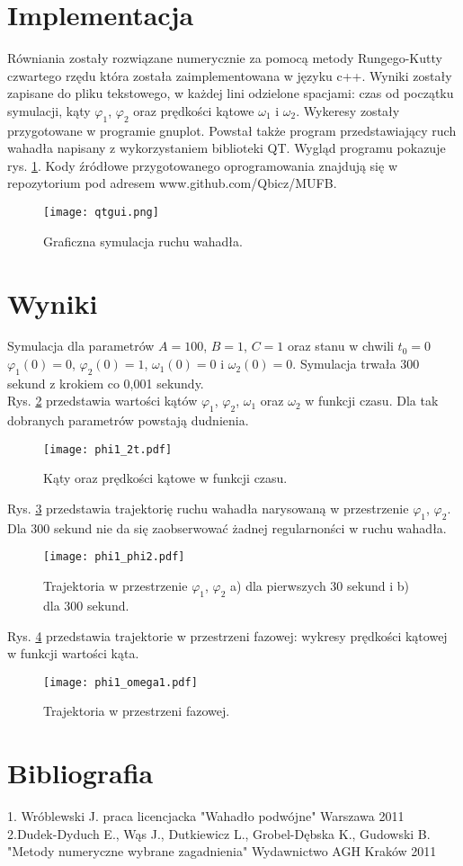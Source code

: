 \documentclass[11pt]{aghdpl}
\begin{document}
\section{Implementacja}
Równiania zostały rozwiązane numerycznie za pomocą metody Rungego-Kutty czwartego rzędu która została zaimplementowana w języku c++. Wyniki zostały zapisane do pliku tekstowego, w każdej lini odzielone spacjami: czas od początku symulacji, kąty $\varphi_1$, $\varphi_2$ oraz prędkości kątowe $\omega_1$ i $\omega_2$. Wykeresy zostały przygotowane w programie gnuplot. Powstał także program przedstawiający ruch wahadła napisany z wykorzystaniem biblioteki QT. Wygląd programu pokazuje rys. \ref{QTgui}. Kody źródłowe przygotowanego oprogramowania znajdują się w repozytorium pod adresem www.github.com/Qbicz/MUFB. 

\begin{figure}[h!]
	\centering
	\label{QTgui}
	\texttt{[image: qtgui.png]}
	\caption{Graficzna symulacja ruchu wahadła.}
\end{figure}

\section{Wyniki}
Symulacja dla parametrów $A = 100$, $B = 1$, $C = 1$ oraz stanu w chwili $t_0=0$ $\varphi_1(0) = 0$, $\varphi_2(0) = 1$, $\omega_1(0) = 0$ i $\omega_2(0) = 0$. Symulacja trwała 300 sekund z krokiem co 0,001 sekundy.  \\
Rys. \ref{phi1_2odt.} przedstawia wartości kątów $\varphi_1$, $\varphi_2$, $\omega_1$ oraz $\omega_2$ w funkcji czasu. Dla tak dobranych parametrów powstają dudnienia.
\begin{figure}[h!]
	\centering
	\label{phi1_2odt.}
	\texttt{[image: phi1\_2t.pdf]}
	\caption{Kąty oraz prędkości kątowe w funkcji czasu.}
\end{figure}
Rys. \ref{phi1_phi2.} przedstawia trajektorię ruchu wahadła narysowaną w przestrzenie $\varphi_1$, $\varphi_2$. Dla 300 sekund nie da się zaobserwować żadnej regularnonści w ruchu wahadła.
\begin{figure}[h!]
	\centering
	\label{phi1_phi2.}
	\texttt{[image: phi1\_phi2.pdf]}
	\caption{Trajektoria w przestrzenie $\varphi_1$, $\varphi_2$ a) dla pierwszych 30 sekund i b) dla 300 sekund.}
\end{figure}
Rys. \ref{phi_omega} przedstawia trajektorie w przestrzeni fazowej: wykresy prędkości kątowej w funkcji wartości kąta.
\begin{figure}[h!]
	\centering
	\label{phi_omega}
	\texttt{[image: phi1\_omega1.pdf]}
	\caption{Trajektoria w przestrzeni fazowej.}
\end{figure}




\section{Bibliografia}
1. Wróblewski J. praca licencjacka "Wahadło podwójne" Warszawa 2011\\
2.Dudek-Dyduch E., Wąs J., Dutkiewicz L., Grobel-Dębska K., Gudowski B. "Metody numeryczne wybrane zagadnienia" Wydawnictwo AGH Kraków 2011 
\end{document}
